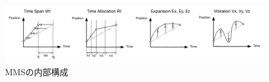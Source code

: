 \documentclass[a4paper,10pt,twocolumn]{jsarticle}
\begin{document}
\begin{figure}[bt]
    \centering
    \includegraphics[width=18cm]{mp2.pdf}
    \vspace{-7mm}
    \caption{MMSの内部構成}
    \label{fig:mp2}
    \vspace{5mm}
\end{figure}



%
\end{document}

